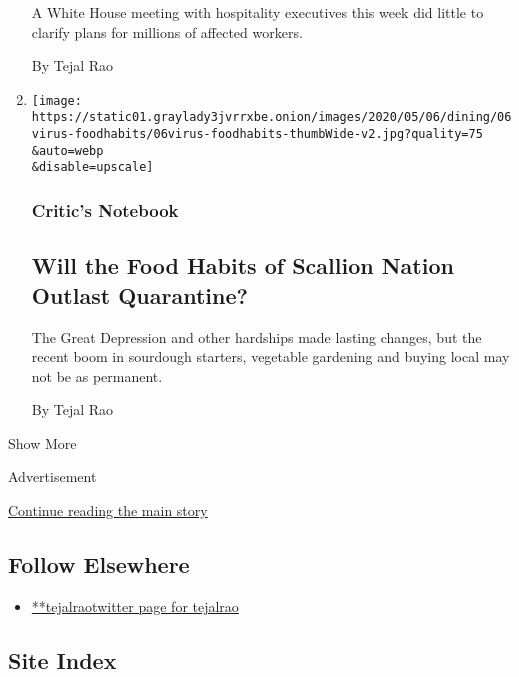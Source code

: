 \begin{enumerate}
  A White House meeting with hospitality executives this week did little
  to clarify plans for millions of affected workers.

  By Tejal Rao
\item
  \href{/2020/04/30/dining/fresh-greens-quarantine-coronavirus.html}{}

  \texttt{[image: https://static01.graylady3jvrrxbe.onion/images/2020/05/06/dining/06virus-foodhabits/06virus-foodhabits-thumbWide-v2.jpg?quality=75\\\&auto=webp\\\&disable=upscale]}

  \hypertarget{critics-notebook-5}{%
  \subsubsection{Critic's Notebook}\label{critics-notebook-5}}

  \hypertarget{will-the-food-habits-of-scallion-nation-outlast-quarantine}{%
  \subsection{Will the Food Habits of Scallion Nation Outlast
  Quarantine?}\label{will-the-food-habits-of-scallion-nation-outlast-quarantine}}

  The Great Depression and other hardships made lasting changes, but the
  recent boom in sourdough starters, vegetable gardening and buying
  local may not be as permanent.

  By Tejal Rao
\end{enumerate}

Show More

Advertisement

\protect\hyperlink{after-mid2}{Continue reading the main story}

\hypertarget{follow-elsewhere}{%
\subsection{Follow Elsewhere}\label{follow-elsewhere}}

\begin{itemize}
\tightlist
\item
  \href{https://twitter.com/tejalrao}{**tejalraotwitter page for
  tejalrao}
\end{itemize}

\hypertarget{site-index}{%
\subsection{Site Index}\label{site-index}}

